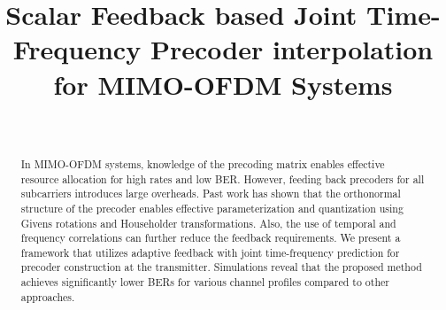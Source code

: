\documentclass[journal,10pt,twocolumn]{IEEEtran}
\begin{document}

\title{Scalar Feedback based Joint Time-Frequency Precoder
  interpolation for  MIMO-OFDM Systems}



 \author{
 \
}
\maketitle

\thispagestyle{plain}



\begin{abstract}

  In MIMO-OFDM systems, knowledge of the precoding matrix enables
  effective resource allocation for high rates and low BER. However,
  feeding back precoders for all subcarriers introduces large
  overheads. Past work has shown that the orthonormal structure of the
  precoder enables effective parameterization and quantization using
  Givens rotations and Householder transformations. Also, the use of
  temporal and frequency correlations can further reduce the feedback
  requirements. We present a framework that utilizes adaptive feedback
  with joint time-frequency prediction for precoder construction at
  the transmitter.  Simulations reveal that the proposed method
  achieves significantly lower BERs for various channel profiles
  compared to other approaches.
\end{abstract}
\end{document}
